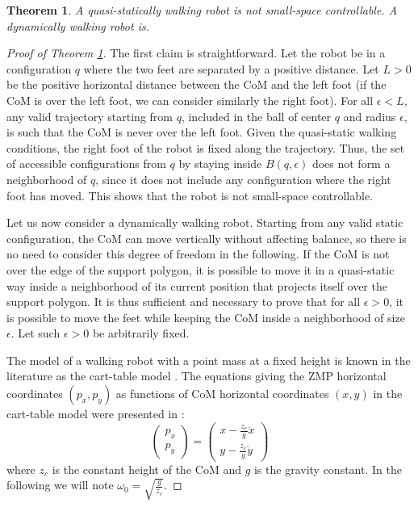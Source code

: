 \documentclass{article}
\newtheorem{theorem}{Theorem}
\begin{document}
\begin{theorem}
\label{thm:humanoid-ssc}
A quasi-statically walking robot is not small-space controllable. A dynamically walking robot is.
\end{theorem}

\begin{proof}[Proof of Theorem \ref{thm:humanoid-ssc}]

The first claim is straightforward. Let the robot be in a configuration $q$ where the two
feet are separated by a positive distance. Let  $L>0$ be the positive horizontal distance
between the CoM and the left foot (if the CoM is over the left foot, we can consider similarly 
the right foot). For all $\epsilon < L$, any valid trajectory starting from $q$, included in
the ball of center $q$ and radius $\epsilon$, is such that the CoM is never over the left foot.
Given the quasi-static walking conditions, the right foot of the robot is fixed along 
the trajectory. Thus, the set of accessible configurations from $q$ by staying inside 
$B(q,\epsilon)$ does not form a neighborhood of $q$, since it does not include any configuration
where the right foot has moved. This shows that the robot is not small-space controllable.

\bigskip

Let us now consider a dynamically walking robot. Starting from any valid static configuration, 
the CoM can move vertically without affecting balance, so there is no need to 
consider this degree of freedom in the following. If the CoM is not over the edge of the support
polygon, it is possible to move it in a quasi-static way inside a neighborhood of its current position that projects itself over the support polygon.
It is thus sufficient and necessary to prove that for all $\epsilon >0$, it is possible to move
the feet while keeping the CoM inside a neighborhood of size $\epsilon$. Let such $\epsilon >0$
be arbitrarily fixed.


The model of a walking robot with a point
mass at a fixed height is known in the literature as the cart-table model \cite{kajita2003biped}.
The equations  giving  the   ZMP  horizontal  coordinates  $(p_x,p_y)$  as
functions  of CoM  horizontal coordinates $(x,y)$  in the  cart-table  model were
presented in \cite{kajita2003biped}:
\begin{equation}
\label{eq:walk-zmp}
\left(
\begin{array}{c}
p_x\\ p_y
\end{array}
\right) = \displaystyle \left(
\begin{array}{c}
x - \frac{z_c}{g} \ddot{x}\\ y - \frac{z_c}{g} \ddot{y}
\end{array}
\right)
\end{equation}
where $z_c$ is  the constant height of the CoM and  $g$ is the gravity
constant.    In    the    following    we    will    note    $\omega_0
=\sqrt{\frac{g}{z_c}}$.


\end{proof}
\end{document}
